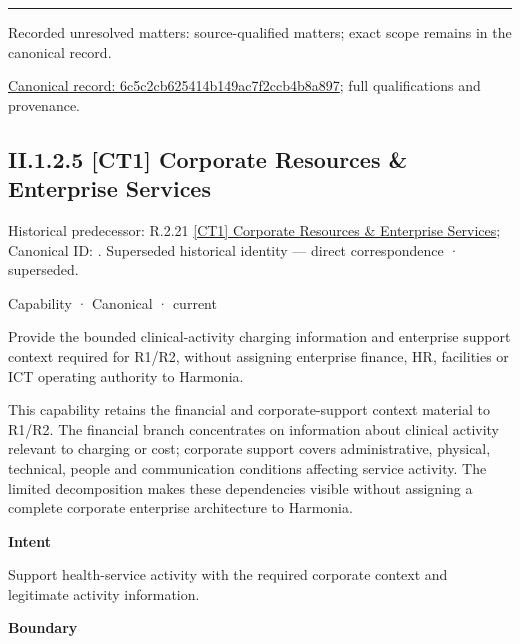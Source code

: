 \medskip\hrule\medskip

{\small Recorded unresolved matters: source-qualified matters; exact scope remains in the canonical record.}\par
{\footnotesize \href{../../../../continuum/strategy/capability/6c5c2cb625414b149ac7f2ccb4b8a897.md}{Canonical record: 6c5c2cb625414b149ac7f2ccb4b8a897}; full qualifications and provenance.}\par
\subsection*{II.1.2.5 [CT1] Corporate Resources \& Enterprise Services}
\label{navigation:II.1.2.5}

{\small Historical predecessor: R.2.21 \hyperref[element:a2dbd74847a44f4c879983229f5c9d08]{[CT1] Corporate Resources \& Enterprise Services}; Canonical ID: \texttt{}. Superseded historical identity — direct correspondence · superseded.}\par
\label{element:b79628f156e14a8cbb82a0dea2fc57ff}
{\small Capability · Canonical · current}\par

Provide the bounded clinical-activity charging information and enterprise support context required for R1/R2, without assigning enterprise finance, HR, facilities or ICT operating authority to Harmonia.



This capability retains the financial and corporate-support context material to R1/R2. The financial branch concentrates on information about clinical activity relevant to charging or cost; corporate support covers administrative, physical, technical, people and communication conditions affecting service activity. The limited decomposition makes these dependencies visible without assigning a complete corporate enterprise architecture to Harmonia.



\textbf{Intent}



Support health-service activity with the required corporate context and legitimate activity information.



\textbf{Boundary}



